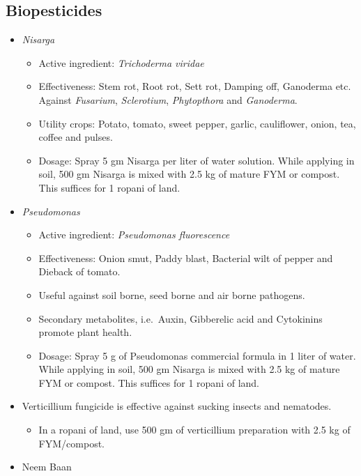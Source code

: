 \documentclass[
  openany]{book}
\providecommand{\tightlist}{%
  \setlength{\itemsep}{0pt}\setlength{\parskip}{0pt}}
\begin{document}
\hypertarget{biopesticides}{%
\subsection{Biopesticides}\label{biopesticides}}

\begin{itemize}
\tightlist
\item
  \emph{Nisarga}

  \begin{itemize}
  \tightlist
  \item
    Active ingredient: \emph{Trichoderma viridae}
  \item
    Effectiveness: Stem rot, Root rot, Sett rot, Damping off, Ganoderma etc. Against \emph{Fusarium}, \emph{Sclerotium}, \emph{Phytopthora} and \emph{Ganoderma}.
  \item
    Utility crops: Potato, tomato, sweet pepper, garlic, cauliflower, onion, tea, coffee and pulses.
  \item
    Dosage: Spray 5 gm Nisarga per liter of water solution. While applying in soil, 500 gm Nisarga is mixed with 2.5 kg of mature FYM or compost. This suffices for 1 ropani of land.
  \end{itemize}
\item
  \emph{Pseudomonas}

  \begin{itemize}
  \tightlist
  \item
    Active ingredient: \emph{Pseudomonas fluorescence}
  \item
    Effectiveness: Onion smut, Paddy blast, Bacterial wilt of pepper and Dieback of tomato.
  \item
    Useful against soil borne, seed borne and air borne pathogens.
  \item
    Secondary metabolites, i.e.~Auxin, Gibberelic acid and Cytokinins promote plant health.
  \item
    Dosage: Spray 5 g of Pseudomonas commercial formula in 1 liter of water. While applying in soil, 500 gm Nisarga is mixed with 2.5 kg of mature FYM or compost. This suffices for 1 ropani of land.
  \end{itemize}
\item
  Verticillium fungicide is effective against sucking insects and nematodes.

  \begin{itemize}
  \tightlist
  \item
    In a ropani of land, use 500 gm of verticillium preparation with 2.5 kg of FYM/compost.
  \end{itemize}
\item
  Neem Baan


\end{itemize}
\end{document}
